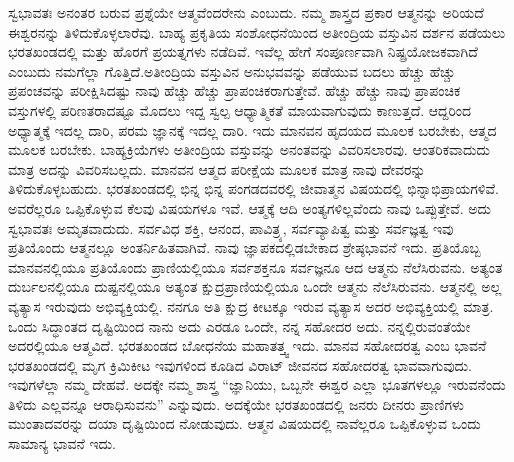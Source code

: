 ಸ್ವಭಾವತಃ ಅನಂತರ ಬರುವ ಪ್ರಶ್ನೆಯೇ ಆತ್ಮವೆಂದರೇನು ಎಂಬುದು. ನಮ್ಮ ಶಾಸ್ತ್ರದ ಪ್ರಕಾರ ಆತ್ಮನನ್ನು ಅರಿಯದೆ ಈಶ್ವರನನ್ನು ತಿಳಿದುಕೊಳ್ಳಲಾರೆವು. ಬಾಹ್ಯ ಪ್ರಕೃತಿಯ ಸಂಶೋಧನೆಯಿಂದ ಅತೀಂದ್ರಿಯ ವಸ್ತುವಿನ ದರ್ಶನ ಪಡೆಯಲು ಭರತಖಂಡದಲ್ಲಿ ಮತ್ತು ಹೊರಗೆ ಪ್ರಯತ್ನಗಳು ನಡೆದಿವೆ. ಇವೆಲ್ಲ ಹೇಗೆ ಸಂಪೂರ್ಣವಾಗಿ ನಿಷ್ಪ್ರಯೋಜಕವಾಗಿದೆ ಎಂಬುದು ನಮಗೆಲ್ಲಾ ಗೊತ್ತಿದೆ.\break ಅತೀಂದ್ರಿಯ ವಸ್ತುವಿನ ಅನುಭವವನ್ನು ಪಡೆಯುವ ಬದಲು ಹೆಚ್ಚು ಹೆಚ್ಚು ಪ್ರಪಂಚವನ್ನು ಪರೀಕ್ಷಿಸಿದಷ್ಟು ನಾವು ಹೆಚ್ಚು ಹೆಚ್ಚು ಪ್ರಾಪಂಚಿಕರಾಗುತ್ತೇವೆ. ಹೆಚ್ಚು ಹೆಚ್ಚು ನಾವು ಪ್ರಾಪಂಚಿಕ ವಸ್ತುಗಳಲ್ಲಿ ಪರಿಣತರಾದಷ್ಟೂ ಮೊದಲು ಇದ್ದ ಸ್ವಲ್ಪ ಆಧ್ಯಾತ್ಮಿಕತೆ ಮಾಯವಾಗುವುದು ಕಾಣುತ್ತದೆ. ಆದ್ದರಿಂದ ಅಧ್ಯಾತ್ಮಕ್ಕೆ ಇದಲ್ಲ ದಾರಿ, ಪರಮ ಜ್ಞಾನಕ್ಕೆ ಇದಲ್ಲ ದಾರಿ. ಇದು ಮಾನವನ ಹೃದಯದ ಮೂಲಕ ಬರಬೇಕು, ಆತ್ಮದ ಮೂಲಕ ಬರಬೇಕು. ಬಾಹ್ಯಕ್ರಿಯೆಗಳು ಅತೀಂದ್ರಿಯ ವಸ್ತುವನ್ನು ಅನಂತವನ್ನು ವಿವರಿಸಲಾರವು. ಆಂತರಿಕವಾದುದು ಮಾತ್ರ ಅದನ್ನು ವಿವರಿಸಬಲ್ಲದು. ಮಾನವನ ಆತ್ಮದ ಪರೀಕ್ಷೆಯ ಮೂಲಕ ಮಾತ್ರ ನಾವು ದೇವರನ್ನು ತಿಳಿದುಕೊಳ್ಳಬಹುದು. ಭರತಖಂಡದಲ್ಲಿ ಭಿನ್ನ ಭಿನ್ನ ಪಂಗಡದವರಲ್ಲಿ ಜೀವಾತ್ಮನ ವಿಷಯದಲ್ಲಿ ಭಿನ್ನಾಭಿಪ್ರಾಯಗಳಿವೆ. ಅವರೆಲ್ಲರೂ ಒಪ್ಪಿಕೊಳ್ಳುವ ಕೆಲವು ವಿಷಯಗಳೂ ಇವೆ. ಆತ್ಮಕ್ಕೆ ಆದಿ ಅಂತ್ಯಗಳಿಲ್ಲವೆಂದು ನಾವು ಒಪ್ಪುತ್ತೇವೆ. ಅದು ಸ್ವಭಾವತಃ ಅಮೃತವಾದುದು. ಸರ್ವವಿಧ ಶಕ್ತಿ, ಆನಂದ, ಪಾವಿತ್ರ್ಯ, ಸರ್ವವ್ಯಾಪಿತ್ವ ಮತ್ತು ಸರ್ವಜ್ಞತ್ವ ಇವು ಪ್ರತಿಯೊಂದು ಆತ್ಮನಲ್ಲೂ ಅಂತರ್ನಿಹಿತವಾಗಿವೆ. ನಾವು ಜ್ಞಾಪಕದಲ್ಲಿಡಬೇಕಾದ ಶ್ರೇಷ್ಠಭಾವನೆ ಇದು. ಪ್ರತಿಯೊಬ್ಬ ಮಾನವನಲ್ಲಿಯೂ ಪ್ರತಿಯೊಂದು ಪ್ರಾಣಿಯಲ್ಲಿಯೂ ಸರ್ವಶಕ್ತನೂ ಸರ್ವಜ್ಞನೂ ಆದ ಆತ್ಮನು ನೆಲೆಸಿರುವನು. ಅತ್ಯಂತ ದುರ್ಬಲನಲ್ಲಿಯೂ ದುಷ್ಟನಲ್ಲಿಯೂ ಅತ್ಯಂತ ಕ್ಷುದ್ರಪ್ರಾಣಿಯಲ್ಲಿಯೂ ಒಂದೇ ಆತ್ಮನು ನೆಲೆಸಿರುವನು. ಆತ್ಮನಲ್ಲಿ ಅಲ್ಲ ವ್ಯತ್ಯಾಸ ಇರುವುದು ಅಭಿವ್ಯಕ್ತಿಯಲ್ಲಿ. ನನಗೂ ಅತಿ ಕ್ಷುದ್ರ ಕೀಟಕ್ಕೂ ಇರುವ ವ್ಯತ್ಯಾಸ ಅದರ ಅಭಿವ್ಯಕ್ತಿಯಲ್ಲಿ ಮಾತ್ರ. ಒಂದು ಸಿದ್ಧಾಂತದ ದೃಷ್ಟಿಯಿಂದ ನಾನು ಅದು ಎರಡೂ ಒಂದೇ, ನನ್ನ ಸಹೋದರ ಅದು. ನನ್ನಲ್ಲಿರುವಂತೆಯೇ ಅದರಲ್ಲಿಯೂ ಆತ್ಮವಿದೆ. ಭರತಖಂಡದ ಬೋಧನೆಯ ಮಹಾತತ್ತ್ವ ಇದು. ಮಾನವ ಸಹೋದರತ್ವ ಎಂಬ ಭಾವನೆ ಭರತಖಂಡದಲ್ಲಿ ಮೃಗ ಕ್ರಿಮಿಕೀಟ ಇವುಗಳಿಂದ ಕೂಡಿದ ವಿರಾಟ್​ ಜೀವನದ ಸಹೋದರತ್ವ ಭಾವವಾಗುವುದು. ಇವುಗಳೆಲ್ಲಾ ನಮ್ಮ ದೇಹವೆ. ಅದಕ್ಕೇ ನಮ್ಮ ಶಾಸ್ತ್ರ “ಜ್ಞಾನಿಯು, ಒಬ್ಬನೇ ಈಶ್ವರ ಎಲ್ಲಾ ಭೂತಗಳಲ್ಲೂ ಇರುವನೆಂದು ತಿಳಿದು ಎಲ್ಲವನ್ನೂ ಆರಾಧಿಸುವನು” ಎನ್ನುವುದು. ಅದಕ್ಕೆಯೇ ಭರತಖಂಡದಲ್ಲಿ ಜನರು ದೀನರು ಪ್ರಾಣಿಗಳು ಮುಂತಾದವರನ್ನು ದಯಾ ದೃಷ್ಟಿಯಿಂದ ನೋಡುವುದು. ಆತ್ಮನ ವಿಷಯದಲ್ಲಿ ನಾವೆಲ್ಲರೂ ಒಪ್ಪಿಕೊಳ್ಳುವ ಒಂದು ಸಾಮಾನ್ಯ ಭಾವನೆ ಇದು.


